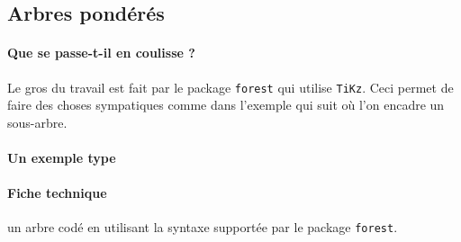 \documentclass[12pt,a4paper]{article}
\begin{document}

    \subsection{Arbres pondérés}
    
            \paragraph{Que se passe-t-il en coulisse ?}

Le gros du travail est fait par le package \verb+forest+ qui utilise \verb+TiKz+. Ceci permet de faire des choses sympatiques comme dans l'exemple qui suit où l'on encadre un sous-arbre.


            \paragraph{Un exemple type}

\begin{tcblisting}{}
\end{tcblisting}


            \paragraph{Fiche technique}


\IDarg{} un arbre codé en utilisant la syntaxe supportée par le package \verb+forest+.
\end{document}
